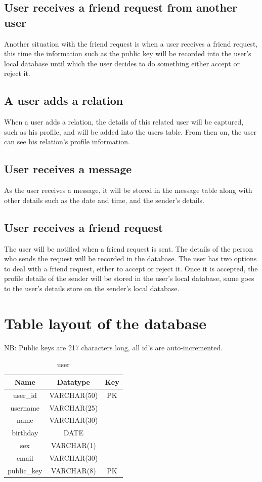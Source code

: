 \subsection{User receives a friend request from another user}
Another situation with the friend request is when a user receives a friend request, this time the information such as the public key will be recorded into the user's local database until which the user decides to do something either accept or reject it.

\subsection{A user adds a relation}
When a user adds a relation, the details of this related user will be captured, such as his profile, and will be added into the users table. From then on, the user can see his relation's profile information. 

\subsection{User receives a message} 
As the user receives a message, it will be stored in the message table along with other details such as the date and time, and the sender's details.

\subsection{User receives a friend request}
The user will be notified when a friend request is sent. The details of the person who sends the request will be recorded in the database. The user has two options to deal with a friend request, either to accept or reject it. Once it is accepted, the profile details of the sender will be stored in the user's local database, same goes to the user's details store on the sender's local database.

\clearpage

\section{Table layout of the database}
NB: Public keys are 217 characters long, all id's are auto-incremented.

\begin{table}[!ht]
\caption{user}
\centering
\begin{tabular}{c c c}
\hline\hline
Name               & Datatype    & Key \\
\hline
user\_id           & VARCHAR(50)  & PK \\  %
username           & VARCHAR(25)  &    \\
name               & VARCHAR(30)  &    \\
birthday           & DATE         &    \\
sex                & VARCHAR(1)   &    \\
email              & VARCHAR(30)  &    \\
public\_key        & VARCHAR(8)   & PK \\
\hline
\end{tabular}
\label{table:nonlin}
\end{table}

